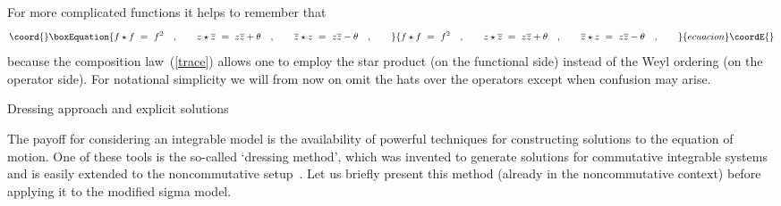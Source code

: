 \documentclass[a4paper,11pt]{article}
\makeatletter
\renewcommand{\section}{\@startsection{section}{1}{0pt}{\medskipamount}
{\medskipamount}{\large\bf}}
\numberwithin{equation}{section}
\def\th{\theta}
\providecommand{\zb}{\overline{z}}
\makeatother
\begin{document}
For more complicated functions it helps to remember that
\begin{equation}\coord{}\boxEquation{
f\star f\ =\ f^2 \quad,\qquad
z\star\zb\ =\ z\zb+\th \quad,\qquad
\zb\star z\ =\ z\zb-\th \quad,\qquad
}{
f\star f\ =\ f^2 \quad,\qquad
z\star\zb\ =\ z\zb+\th \quad,\qquad
\zb\star z\ =\ z\zb-\th \quad,\qquad
}{ecuacion}\coordE{}\end{equation}
because the composition law~(\ref{trace}) allows one to employ the
star product (on the functional side) instead of the Weyl ordering
(on the operator side).
For notational simplicity we will from now on omit the hats over the operators
except when confusion may arise.


\section{Dressing approach and explicit solutions}

\noindent
The payoff for considering an integrable model is the availability of
powerful techniques for constructing solutions to the equation of motion.
One of these tools is the so-called `dressing method', which was invented to
generate solutions for commutative integrable systems
\cite{zakharov,zakh2,forgacs}
and is easily extended to the noncommutative setup~\cite{LPS2}.
Let us briefly present this method (already in the noncommutative context)
before applying it to the modified sigma model.
\end{document}
